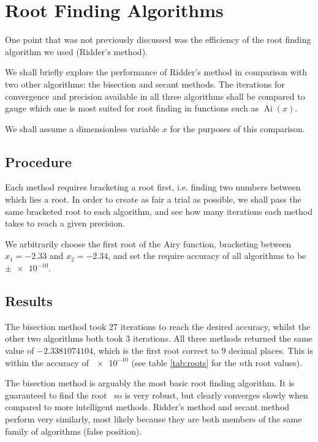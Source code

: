 \documentclass[]{article}
\newcommand{\Ai}[1]{\ensuremath{\operatorname{Ai}({#1})}}
\begin{document}
\section{Root Finding Algorithms}\label{sec:algorithms}

One point that was not previously discussed was the efficiency of the root finding algorithm we used (Ridder's method).

We shall briefly explore the performance of Ridder's method in comparison with two other algorithms: the bisection and secant methods. The iterations for convergence and precision available in all three algorithms shall be compared to gauge which one is most suited for root finding in functions such as \Ai{x}.

We shall assume a dimensionless variable $x$ for the purposes of this comparison.

\subsection{Procedure}\label{ssec:procedure}

Each method requires bracketing a root first, i.e. finding two numbers between which lies a root. In order to create as fair a trial as possible, we shall pass the same bracketed root to each algorithm, and see how many iterations each method takes to reach a given precision.

We arbitrarily choose the first root of the Airy function, bracketing between $x_{1} = -2.33$ and $x_{2} = -2.34$, and set the require accuracy of all algorithms to be $\pm\num{e-10}$.

\subsection{Results}\label{ssec:results}

The bisection method took 27 iterations to reach the desired accuracy, whilst the other two algorithms both took 3 iterations. All three methods returned the same value of  $-2.3381074104$, which is the first root correct to 9 decimal places. This is within the accuracy of $\num{e-10}$ (see table \ref{tab:roots} for the $n$th root values).

The bisection method is arguably the most basic root finding algorithm. It is guaranteed to find the root~\cite{ref:nr} so is very robust, but clearly converges slowly when compared to more intelligent methods. Ridder's method and secant method perform very similarly, most likely because they are both members of the same family of algorithms (false position).
\end{document}
